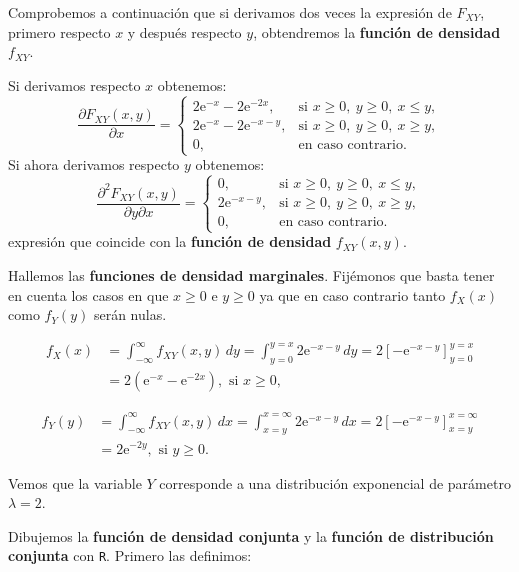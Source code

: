 \documentclass[]{book}
\begin{document}
Comprobemos a continuación que si derivamos dos veces la expresión de \(F_{XY}\), primero respecto \(x\) y después respecto \(y\), obtendremos la \textbf{función de densidad} \(f_{XY}\).

Si derivamos respecto \(x\) obtenemos:
\[
\frac{\partial F_{XY}(x,y)}{\partial x}=\begin{cases}
2\mathrm{e}^{-x}-2\mathrm{e}^{-2x}, & \mbox{si }x\geq 0,\ y\geq 0,\ x\leq y,\\
2\mathrm{e}^{-x}-2\mathrm{e}^{-x-y}, & \mbox{si }x\geq 0,\ y\geq 0,\ x\geq y,\\
0, & \mbox{en caso contrario.}
\end{cases}
\]
Si ahora derivamos respecto \(y\) obtenemos:
\[
\frac{\partial^2 F_{XY}(x,y)}{\partial y\partial x}=\begin{cases}
0, & \mbox{si }x\geq 0,\ y\geq 0,\ x\leq y,\\
2\mathrm{e}^{-x-y}, & \mbox{si }x\geq 0,\ y\geq 0,\ x\geq y,\\
0, & \mbox{en caso contrario.}
\end{cases}
\]
expresión que coincide con la \textbf{función de densidad} \(f_{XY}(x,y)\).

Hallemos las \textbf{funciones de densidad marginales}. Fijémonos que basta tener en cuenta los casos en que \(x\geq 0\) e \(y\geq 0\) ya que en caso contrario tanto \(f_X(x)\) como \(f_Y(y)\) serán nulas.

\[
\begin{array}{rl}
f_X(x) &=   \int_{-\infty}^{\infty} f_{XY}(x,y)\, dy =\int_{y=0}^{y=x}2\mathrm{e}^{-x-y}\, dy = 2\left[-\mathrm{e}^{-x-y}\right]_{y=0}^{y=x} \\ &=   2\left(\mathrm{e}^{-x}-\mathrm{e}^{-2x}\right),\mbox{ si }x\geq 0,
\end{array}
\]

\[
\begin{array}{rl}
f_Y(y) & =  \int_{-\infty}^{\infty} f_{XY}(x,y)\, dx =\int_{x=y}^{x=\infty}2\mathrm{e}^{-x-y}\, dx = 2\left[-\mathrm{e}^{-x-y}\right]_{x=y}^{x=\infty}\\ &= 2\mathrm{e}^{-2y}, \mbox{ si }y\geq 0.
\end{array}
\]

Vemos que la variable \(Y\) corresponde a una distribución exponencial de parámetro \(\lambda =2\).

Dibujemos la \textbf{función de densidad conjunta} y la \textbf{función de distribución conjunta} con \texttt{R}. Primero las definimos:
\end{document}
